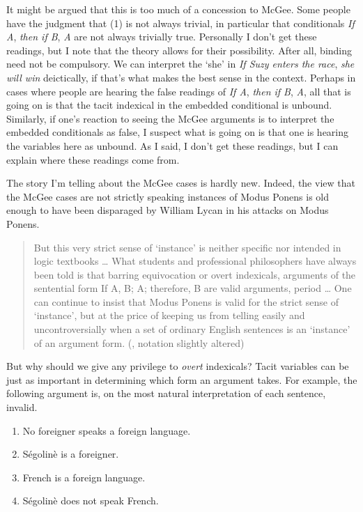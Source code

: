 \documentclass[
  11pt,
  letterpaper,
  DIV=11,
  numbers=noendperiod,
  oneside]{scrartcl}
\providecommand{\tightlist}{%
  \setlength{\itemsep}{0pt}\setlength{\parskip}{0pt}}\usepackage{longtable,booktabs,array}
\begin{document}
It might be argued that this is too much of a concession to McGee. Some
people have the judgment that (1) is not always trivial, in particular
that conditionals \emph{If A}, \emph{then if B}, \emph{A} are not always
trivially true. Personally I don't get these readings, but I note that
the theory allows for their possibility. After all, binding need not be
compulsory. We can interpret the `she' in \emph{If Suzy enters the
race}, \emph{she will win} deictically, if that's what makes the best
sense in the context. Perhaps in cases where people are hearing the
false readings of \emph{If A}, \emph{then if B}, \emph{A}, all that is
going on is that the tacit indexical in the embedded conditional is
unbound. Similarly, if one's reaction to seeing the McGee arguments is
to interpret the embedded conditionals as false, I suspect what is going
on is that one is hearing the variables here as unbound. As I said, I
don't get these readings, but I can explain where these readings come
from.

The story I'm telling about the McGee cases is hardly new. Indeed, the
view that the McGee cases are not strictly speaking instances of Modus
Ponens is old enough to have been disparaged by William Lycan in his
attacks on Modus Ponens.

\begin{quote}
But this very strict sense of `instance' is neither specific nor
intended in logic textbooks \ldots{} What students and professional
philosophers have always been told is that barring equivocation or overt
indexicals, arguments of the sentential form If A, B; A; therefore, B
are valid arguments, period \ldots{} One can continue to insist that
Modus Ponens is valid for the strict sense of `instance', but at the
price of keeping us from telling easily and uncontroversially when a set
of ordinary English sentences is an `instance' of an argument form.
(, notation slightly altered)
\end{quote}

But why should we give any privilege to \emph{overt} indexicals? Tacit
variables can be just as important in determining which form an argument
takes. For example, the following argument is, on the most natural
interpretation of each sentence, invalid.

\begin{enumerate}
\def\labelenumi{\arabic{enumi}.}
\tightlist
\item
  No foreigner speaks a foreign language.
\item
  Ségolinè is a foreigner.
\item
  French is a foreign language.
\item
  Ségolinè does not speak French.
\end{enumerate}
\end{document}

